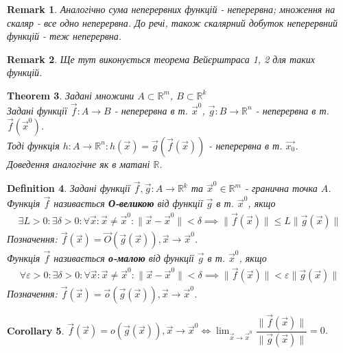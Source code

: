 \documentclass[a4paper, 10pt]{article}
\theoremstyle{theoremdd}
\newtheorem{theorem}{Theorem}[subsection]
\theoremstyle{theoremdd}
\theoremstyle{theoremdd}
\newtheorem{definition}[theorem]{Definition}
\theoremstyle{theoremdd}
\theoremstyle{theoremdd}
\theoremstyle{theoremdd}
\theoremstyle{theoremdd}
\newtheorem{remark}[theorem]{Remark}
\theoremstyle{theoremdd}
\theoremstyle{theoremdd}
\newtheorem{corollary}[theorem]{Corollary}
\newcommand\Norm[1]{\lVert#1\rVert}
\begin{document}
\begin{remark}
Аналогічно сума неперервних функцій - неперервна; множення на скаляр - все одно неперервна. До речі, також скалярний добуток неперервний функцій - теж неперервна.
\end{remark}

\begin{remark}
Ще тут виконується теорема Вейєрштраса 1, 2 для таких функцій.
\end{remark}

\begin{theorem}
Задані множини $A \subset \mathbb{R}^m$, $B \subset \mathbb{R}^k$\\
Задані функції $\vec{f}: A \to B$ - неперервна в т. $\vec{x}^0$, $\vec{g}: B \to \mathbb{R}^n$ - неперервна в т. $\vec{f}(\vec{x}^0)$.\\
Тоді функція $h: A \to \mathbb{R}^n: h(\vec{x}) = \vec{g}(\vec{f}(\vec{x}))$ - неперервна в т. $\vec{x_0}$.\\
\textit{Доведення аналогічне як в матані $\mathbb{R}$.}
\end{theorem}

\begin{definition}
Задані функції $\vec{f},\vec{g}: A \to \mathbb{R}^k$ та $\vec{x}^0 \in \mathbb{R}^m$ - гранична точка $A$.\\
Функція $\vec{f}$ називається \textbf{О-великою} від функції $\vec{g}$ в т. $\vec{x}^0$, якщо
\begin{align*}
\exists L>0: \exists \delta > 0: \forall \vec{x}: \vec{x} \neq \vec{x}^0: \Norm{\vec{x} - \vec{x}^0} < \delta \implies \Norm{\vec{f}(\vec{x})} \leq L \Norm{\vec{g}(\vec{x})}
\end{align*}
Позначення: $\vec{f}(\vec{x}) = \vec{O}(\vec{g}(\vec{x})), \vec{x} \to \vec{x}^0$.\\
Функція $\vec{f}$ називається \textbf{о-малою} від функції $\vec{g}$ в т. $\vec{x}^0$, якщо
\begin{align*}
\forall \varepsilon>0: \exists \delta > 0: \forall \vec{x}: \vec{x} \neq \vec{x}^0: \Norm{\vec{x} - \vec{x}^0} < \delta \implies \Norm{\vec{f}(\vec{x})} < \varepsilon \Norm{\vec{g}(\vec{x})}
\end{align*}
Позначення: $\vec{f}(\vec{x}) = \vec{o}(\vec{g}(\vec{x})), \vec{x} \to \vec{x}^0$.
\end{definition}

\begin{corollary}
$\vec{f}(\vec{x}) = o(\vec{g}(\vec{x})), \vec{x} \to \vec{x}^0 \iff \displaystyle\lim_{\vec{x} \to \vec{x}^0} \dfrac{\Norm{\vec{f}(\vec{x})}}{\Norm{\vec{g}(\vec{x})}} = 0$.
\end{corollary}
\end{document}
